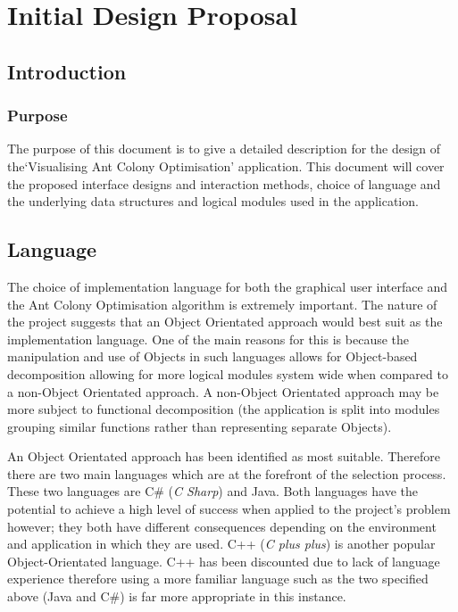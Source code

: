 \chapter{Initial Design Proposal}
\renewcommand{\thechapter}{\Alph{chapter}}
\section{Introduction}

\subsection{Purpose}

The purpose of this document is to give a detailed description for the design of the`Visualising Ant Colony Optimisation' application. This document will cover the proposed interface designs and interaction methods, choice of language and the underlying data structures and logical modules used in the application.

\section{Language}
\label{lang}
The choice of implementation language for both the graphical user interface and the Ant Colony Optimisation algorithm is extremely important. The nature of the project suggests that an Object Orientated approach would best suit as the implementation language. One of the main reasons for this is because the manipulation and use of Objects in such languages allows for Object-based decomposition allowing for more logical modules system wide when compared to a non-Object Orientated approach. A non-Object Orientated approach may be more subject to functional decomposition (the application is split into modules grouping similar functions rather than representing separate Objects).

An Object Orientated approach has been identified as most suitable. Therefore there are two main languages which are at the forefront of the selection process. These two languages are C\# (\textit{C Sharp}) and Java. Both languages have the potential to achieve a high level of success when applied to the project’s problem however; they both have different consequences depending on the environment and application in which they are used. C++ (\textit{C plus plus}) is another popular Object-Orientated language.  C++ has been discounted due to lack of language experience therefore using a more familiar language such as the two specified above (Java and C\#) is far more appropriate in this instance. 

